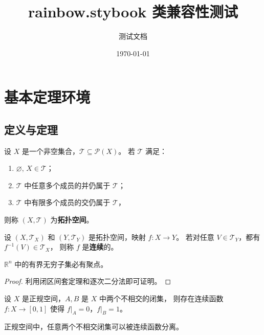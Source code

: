 \documentclass[12pt,a4paper]{ctexbook}
\title{\textbf{rainbow.sty\enspace book 类兼容性测试}}
\author{测试文档}
\date{\today}
\begin{document}
\maketitle
\tableofcontents
\mainmatter

\chapter{基本定理环境}

\section{定义与定理}

\begin{definition}[拓扑空间]
设 $X$ 是一个非空集合，$\mathcal{T}\subseteq\mathcal{P}(X)$。
若 $\mathcal{T}$ 满足：
\begin{enumerate}
  \item $\varnothing,\,X\in\mathcal{T}$；
  \item $\mathcal{T}$ 中任意多个成员的并仍属于 $\mathcal{T}$；
  \item $\mathcal{T}$ 中有限多个成员的交仍属于 $\mathcal{T}$，
\end{enumerate}
则称 $(X,\mathcal{T})$ 为\textbf{拓扑空间}。
\end{definition}

\begin{definition}[连续映射]
设 $(X,\mathcal{T}_X)$ 和 $(Y,\mathcal{T}_Y)$ 是拓扑空间，映射 $f\colon X\to Y$。
若对任意 $V\in\mathcal{T}_Y$，都有 $f^{-1}(V)\in\mathcal{T}_X$，
则称 $f$ 是\textbf{连续}的。
\end{definition}

\begin{theorem}
$\mathbb{R}^n$ 中的有界无穷子集必有聚点。
\end{theorem}

\begin{proof}
利用闭区间套定理和逐次二分法即可证明。
\end{proof}

\begin{lemma}[Urysohn 引理]
设 $X$ 是正规空间，$A,B$ 是 $X$ 中两个不相交的闭集，
则存在连续函数 $f\colon X\to[0,1]$ 使得 $f|_A=0$，$f|_B=1$。
\end{lemma}

\begin{corollary}
正规空间中，任意两个不相交闭集可以被连续函数分离。
\end{corollary}
\end{document}

